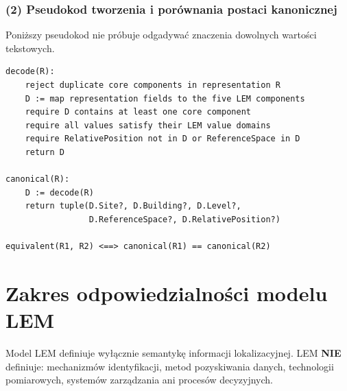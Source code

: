 \subsubsection*{(2) Pseudokod tworzenia i porównania postaci kanonicznej}
Poniższy pseudokod nie próbuje odgadywać znaczenia dowolnych wartości tekstowych.

\begin{verbatim}
decode(R):
    reject duplicate core components in representation R
    D := map representation fields to the five LEM components
    require D contains at least one core component
    require all values satisfy their LEM value domains
    require RelativePosition not in D or ReferenceSpace in D
    return D

canonical(R):
    D := decode(R)
    return tuple(D.Site?, D.Building?, D.Level?,
                 D.ReferenceSpace?, D.RelativePosition?)

equivalent(R1, R2) <==> canonical(R1) == canonical(R2)
\end{verbatim}

\section{Zakres odpowiedzialności modelu LEM}
\label{sec:odpowiedzialnosc}
Model LEM definiuje wyłącznie semantykę informacji lokalizacyjnej. LEM \textbf{NIE} definiuje: mechanizmów identyfikacji, metod pozyskiwania danych, technologii pomiarowych, systemów zarządzania ani procesów decyzyjnych.
